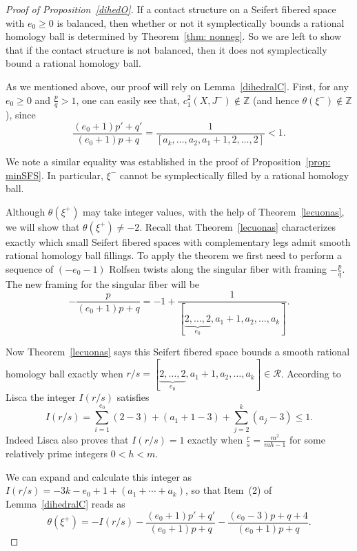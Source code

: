 \documentclass[11pt]{amsart}
\theoremstyle{plain}
\theoremstyle{definition}
\theoremstyle{remark}
\numberwithin{theorem}{section}
\newcommand{\Z}{\mathbb{Z}}           %
\begin{document}
\begin{proof}[Proof of Proposition~\ref{dihedO}] 
If a contact structure on a Seifert fibered space with $e_0\geq 0$ is balanced, then whether or not it symplectically bounds a rational homology ball is determined by Theorem~\ref{thm: nonneg}. So we are left to show that if the contact structure is not balanced, then it does not symplectically bound a rational homology ball. 

As we mentioned above, our proof will rely on  Lemma~\ref{dihedralC}. First, for any $e_0\geq 0$ and $\frac{p}{q}>1$, one can easily see that, $c_1^2(X, J^-) \notin \Z$ (and hence $\theta(\xi^-)\notin \Z$), since 
\[
\frac{(e_0+1)p'+q'}{(e_0+1)p+q}=\frac{1}{[a_k,\ldots, a_2,  a_1+1, 2, \ldots, 2]}<1.
\]


\noindent We note a similar equality was established in the proof of Proposition~\ref{prop: minSFS}.
In particular,  $\xi^{-}$ cannot be symplectically filled by a rational homology ball. 

Although  $\theta(\xi^{+})$ may take integer values, with the help of Theorem~\ref{lecuonas}, we will show that $\theta(\xi^+)\neq -2$. Recall that Theorem~\ref{lecuonas} characterizes exactly which small Seifert fibered spaces with complementary legs admit smooth rational homology ball fillings. To apply the theorem we first need to perform a sequence of $(-e_0-1)$ Rolfsen twists along the singular fiber with framing $-\frac{p}{q}$. The new framing for the singular fiber will be  \[-\frac{p}{(e_0+1)p+q}=-1+ \frac{1}{[\underbrace{2, \ldots, 2}_{e_0}, a_1+1, a_2, \ldots, a_k]}.\]


\noindent Now Theorem~\ref{lecuonas} says this Seifert fibered space bounds a smooth rational homology ball exactly when $r/s=[\underbrace{2, \ldots, 2}_{e_0}, a_1+1, a_2, \ldots, a_k]\in \mathcal R$. According to Lisca \cite{Lisca2007} the integer $I(r/s)$ satisfies \[I(r/s)=\sum_{i=1}^{e_0} (2-3)+(a_1+1-3)+\sum_{j=2}^k(a_j-3)\leq 1.\]  Indeed Lisca also proves that $I(r/s)=1$ exactly when $\frac{r}{s}=\frac{m^2}{mh-1}$ for some relatively prime integers $0<h<m$. 

We can expand and calculate this integer as $I(r/s)=-3k-e_0+1+(a_1+\cdots +a_k)$, so that Item~(2) of Lemma~\ref{dihedralC} reads as 
\begin{equation}\label{thetaC}
\theta(\xi^+)=-I(r/s)-\frac{(e_0+1)p'+q'}{(e_0+1)p+q}-\frac{(e_0-3)p+q+4}{(e_0+1)p+q}.   
\end{equation}


\end{proof}
\end{document}
